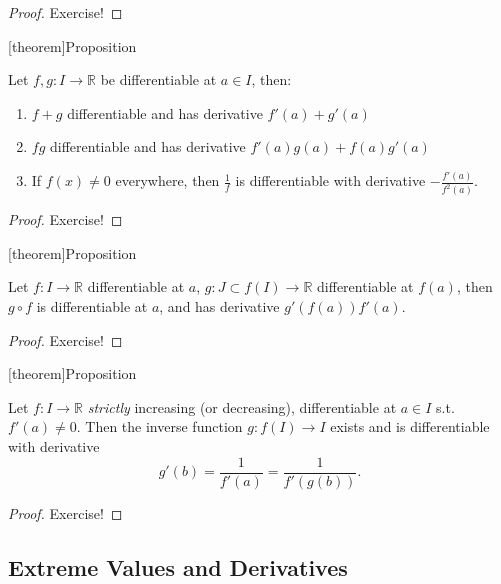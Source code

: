 \documentclass[12pt]{report}
\theoremstyle{definition}
\begin{document}
\begin{proof}
    Exercise!
\end{proof}

[theorem]{Proposition}
\begin{differentiation properties}
    Let $f,g: I\rightarrow{}\mathbb{R}$ be differentiable at $a \in I$, then:
    \begin{enumerate}
        \item $f+g$ differentiable and has derivative $f'(a) + g'(a)$
        \item $fg$ differentiable and has derivative $f'(a)g(a) + f(a)g'(a)$
        \item If $f(x) \neq 0$ everywhere, then $\frac{1}{f}$ is differentiable
            with derivative $-\frac{f'(a)}{f^{2}(a)}$.
    \end{enumerate}
\end{differentiation properties}

\begin{proof}
    Exercise!
\end{proof}

[theorem]{Proposition}
\begin{chain rule}
    Let $f:I\rightarrow{}\mathbb{R}$ differentiable at $a$, 
    $g:J\subset f(I) \rightarrow{}\mathbb{R}$ differentiable at $f(a)$,
    then $g\circ f$ is differentiable at $a$, and has derivative $g'(f(a))f'(a)$.
\end{chain rule}

\begin{proof}
    Exercise!
\end{proof}

[theorem]{Proposition}
\begin{inverse function differentiation}
    Let $f:I\rightarrow{}\mathbb{R}$ \emph{strictly} increasing (or decreasing),
    differentiable at $a\in I$ s.t. $f'(a) \neq 0$.
    Then the inverse function $g:f(I)\rightarrow{}I$ exists and is differentiable with derivative\[
        g'(b) = \frac{1}{f'(a)} = \frac{1}{f'(g(b))}.
    \]
\end{inverse function differentiation}

\begin{proof}
    Exercise!
\end{proof}

\subsection{Extreme Values and Derivatives}
\end{document}
